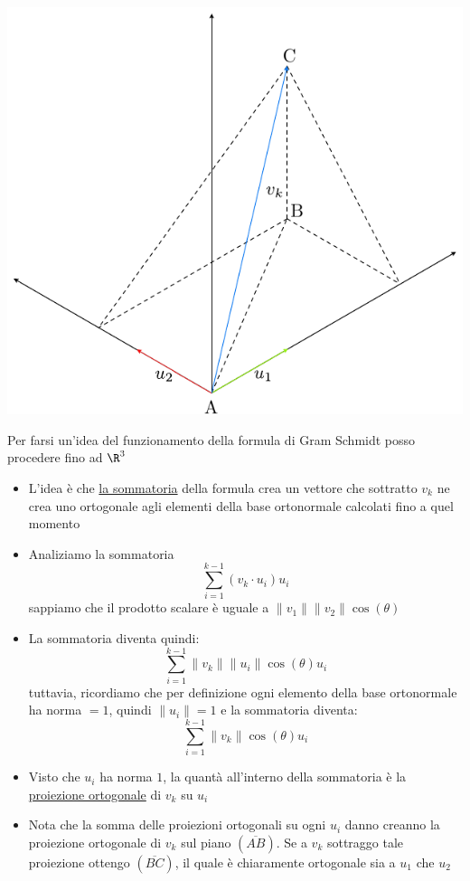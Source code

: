\begin{center}
	\includegraphics{Images/Gram scmidt.pdf}
\end{center}

Per farsi un'idea del funzionamento della formula di Gram Schmidt posso procedere fino ad $ \R^{3} $
\begin{itemize}
	\item L'idea è che \underline{la sommatoria} della formula crea un vettore che sottratto $ v_k $ ne crea uno ortogonale agli elementi della base ortonormale calcolati fino a quel momento
	\item Analiziamo la sommatoria
	      \[
		      \sum_{i=1}^{k-1}\left(v_k \cdot u_i\right) u_i
	      \]
	      sappiamo che il prodotto scalare è uguale a $ \|v_1\|\|v_2\| \cos \left( \theta  \right)  $
	\item La sommatoria diventa quindi:
	      \[
		      \sum_{i=1}^{k-1}\|v_k\| \|u_i\| \cos \left( \theta  \right)  u_i
	      \]
	      tuttavia, ricordiamo che per definizione ogni elemento della base ortonormale ha norma $ =1 $, quindi $ \|u_i\|=1 $ e la sommatoria diventa:
	      \[
		      \sum_{i=1}^{k-1}\|v_k\|  \cos \left( \theta  \right)  u_i
	      \]
	\item Visto che $ u_i $ ha norma $ 1 $, la quantà all'interno della sommatoria è la \underline{proiezione ortogonale} di $ v_k $ su $ u_i $
	\item Nota che la somma delle proiezioni ortogonali su ogni $ u_i $ danno creanno la proiezione ortogonale di $ v_k $ sul piano $ \left( \overline{AB} \right)  $. Se a $ v_k$ sottraggo tale proiezione ottengo $ \left( \overline{BC} \right)  $, il quale è chiaramente ortogonale sia a $ u_1 $ che $ u_2 $
\end{itemize}







